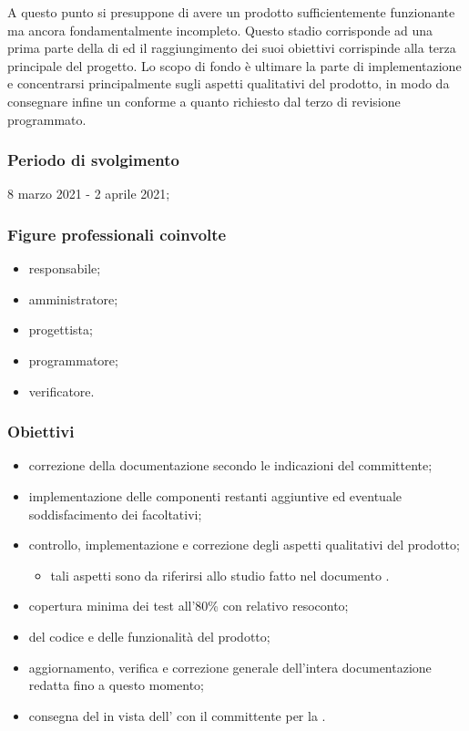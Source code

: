 A questo punto si presuppone di avere un prodotto sufficientemente funzionante ma ancora fondamentalmente incompleto. Questo stadio corrisponde ad una prima parte della  di  ed il raggiungimento dei suoi obiettivi corrispinde alla terza  principale del progetto. Lo scopo di fondo è ultimare la parte di implementazione e concentrarsi principalmente sugli aspetti qualitativi del prodotto, in modo da consegnare infine un  conforme a quanto richiesto dal terzo  di revisione programmato.
        
        \subsubsection{Periodo di svolgimento}
        8 marzo 2021 - 2 aprile 2021;
        
        \subsubsection{Figure professionali coinvolte}
            \begin{itemize}
                \item responsabile;
                \item amministratore;
                \item progettista;
                \item programmatore;
                \item verificatore.
            \end{itemize}

        \subsubsection{Obiettivi}
        \begin{itemize}
            \item correzione della documentazione secondo le indicazioni del committente;
            \item implementazione delle componenti restanti aggiuntive ed eventuale soddisfacimento dei  facoltativi;
            \item controllo, implementazione e correzione degli aspetti qualitativi del prodotto;
            \begin{itemize}
                \item tali aspetti sono da riferirsi allo studio fatto nel documento \PdQ{}. %
            \end{itemize}
            \item copertura minima dei test all'80\% con relativo resoconto;
            \item {} del codice e delle funzionalità del prodotto;
            \item aggiornamento, verifica e correzione generale dell'intera documentazione redatta fino a questo momento;
            \item consegna del  in vista dell' con il committente per la \RQ{}.
        \end{itemize}